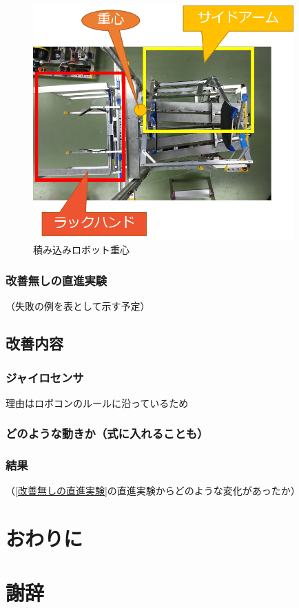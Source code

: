 \documentclass[12pt,oneside]{sotsuken_paper}
\begin{document}
		\begin{figure}[htp]
			\begin{center}
				\includegraphics[width=100mm]{Image/積込ロボット重心.png}
				\caption{積み込みロボット重心}
				\label{積込ロボット重心}
			\end{center}
		\end{figure} 

		\subsection{改善無しの直進実験}
		（失敗の例を表として示す予定）
		\label{改善無しの直進実験}

	\section{改善内容}

		\subsection{ジャイロセンサ}
		理由はロボコンのルールに沿っているため

		\subsection{どのような動きか（式に入れることも）}

		\subsection{結果}
		（\ref{改善無しの直進実験}の直進実験からどのような変化があったか）

\chapter{おわりに}

\begin{thebibliography}{0}

\end{thebibliography}

\chapter*{謝辞}


\end{document}
